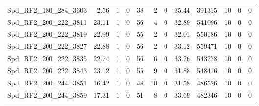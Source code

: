 \begin{longtable}[c]{@{}lrrrrrrrrrrr@{}}
Spd\_RF2\_180\_284\_3603      & 2.56                   & 1                       & 0                       & 38                     & 2                       & 0                       & 35.44                   & 391315                   & 10                       & 0                        & 0                        \\
Spd\_RF2\_200\_222\_3811      & 23.11                  & 1                       & 0                       & 56                     & 4                       & 0                       & 32.89                   & 541096                   & 10                       & 0                        & 0                        \\
Spd\_RF2\_200\_222\_3819      & 22.99                  & 1                       & 0                       & 55                     & 2                       & 0                       & 32.01                   & 550186                   & 10                       & 0                        & 0                        \\
Spd\_RF2\_200\_222\_3827      & 22.88                  & 1                       & 0                       & 56                     & 2                       & 0                       & 33.12                   & 559471                   & 10                       & 0                        & 0                        \\
Spd\_RF2\_200\_222\_3835      & 22.74                  & 1                       & 0                       & 56                     & 6                       & 0                       & 33.26                   & 543278                   & 10                       & 0                        & 0                        \\
Spd\_RF2\_200\_222\_3843      & 23.12                  & 1                       & 0                       & 55                     & 9                       & 0                       & 31.88                   & 548416                   & 10                       & 0                        & 0                        \\
Spd\_RF2\_200\_244\_3851      & 16.42                  & 1                       & 0                       & 48                     & 10                      & 0                       & 31.58                   & 486526                   & 10                       & 0                        & 0                        \\
Spd\_RF2\_200\_244\_3859      & 17.31                  & 1                       & 0                       & 51                     & 8                       & 0                       & 33.69                   & 482346                   & 10                       & 0                        & 0                        \\

\end{longtable}
